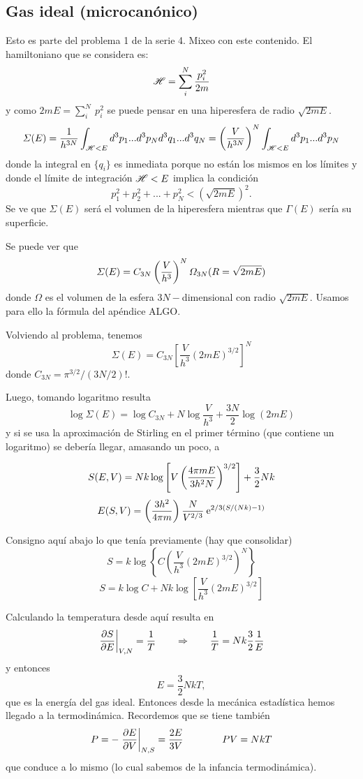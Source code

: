 \documentclass[10pt,oneside]{CBFT_book}
\begin{document}
\subsection{Gas ideal (microcanónico)}

Esto es parte del problema 1 de la serie 4. Mixeo con este contenido.
El hamiltoniano que se considera es:
\[
	\mathscr{H} =  \sum_i^{N} \frac{p^2_i}{2m}
\]
y como $ 2 m E = \sum_i^N \: p_i^2 $ se puede pensar en una hiperesfera de radio $\sqrt{2mE}$.
\[
	\Sigma(E) = \frac{1}{h^{3N}} \int_{\mathscr{H} < E} d^3p_1 ... d^3p_N d^3q_1 ... d^3q_N = 
	\left( \frac{V}{h^{3N}} \right)^N \int_{\mathscr{H} < E} d^3p_1 ... d^3p_N
\]
donde la integral en $\{ q_i\}$ es inmediata porque no están los mismos en los límites y donde el
límite de integración $\mathscr{H} < E$ implica la condición 
\[
	p_1^2 + p_2^2 + ... + p_N^2 < ( \sqrt{2mE} )^2.
\]
Se ve que $\Sigma(E) $ será el volumen de la hiperesfera mientras que $\Gamma(E)$ sería su
superficie.

Se puede ver que 
\[
	\Sigma(E) = C_{3N} \left( \frac{ V }{ h^3 } \right)^N \Omega_{3N}( R = \sqrt{2mE} )
\]
donde $ \Omega $ es el volumen de la esfera $3N-$dimensional con radio $\sqrt{2mE}$.
Usamos para ello la fórmula del apéndice ALGO.

Volviendo al problema, tenemos
\[
	\Sigma(E) = C_{3N} \left[ \frac{V}{h^3} (2mE)^{3/2}\right]^N
\]
donde $C_{3N}= \pi^{3/2} / (3 N/2)! $.

Luego, tomando logaritmo resulta
\[
	\log \Sigma(E) = \log C_{3N} + N \log \frac{V}{h^3} + \frac{3N}{2} \log (2mE)
\]
y si se usa la aproximación de Stirling en el primer término (que contiene un logaritmo) 
se debería llegar, amasando un poco, a

\[
	S(E,V) = N k \log \left[ V \left( \frac{ 4 \pi m E }{ 3 h^2 N } \right)^{3/2} \right] + \frac{3}{2} Nk
\]
\[
	E(S,V) = \left( \frac{ 3h^2 }{ 4\pi m } \right) \frac{N}{V^{2/3}} \:\mathrm{e}^{ 2/3(S/(Nk) -1 )}
\]

Consigno aquí abajo lo que tenía previamente (hay que consolidar)
\[
	S = k \log \left\{ C\left( \frac{V}{h^3}(2mE)^{3/2}\right)^N \right\}
\]
\[
	S = k \log C + N k \log \left[ \frac{V}{h^3}(2mE)^{3/2}\right]
\]

Calculando la temperatura desde aquí resulta en
\[
	\left. \frac{\partial^{\hspace{-0.05em}} {S}}{\partial {E}^{\hspace{-0.05em}}} \right|_{V,N} = \frac{1}{T} \qquad \Rightarrow \qquad \frac{1}{T} = Nk\frac{3}{2}\frac{1}{E}
\]
y entonces
\[
	E = \frac{3}{2} NkT,
\]
que es la energía del gas ideal.
Entonces desde la mecánica estadística hemos llegado a la termodinámica. Recordemos que
se tiene también
\[
	P = - \left.\frac{\partial^{\hspace{-0.05em}} {E}}{\partial {V}^{\hspace{-0.05em}}}\right|_{N,S} = \frac{2E}{3V} \qquad \qquad PV = NkT
\]
que conduce a lo mismo (lo cual sabemos de la infancia termodinámica).
\end{document}
